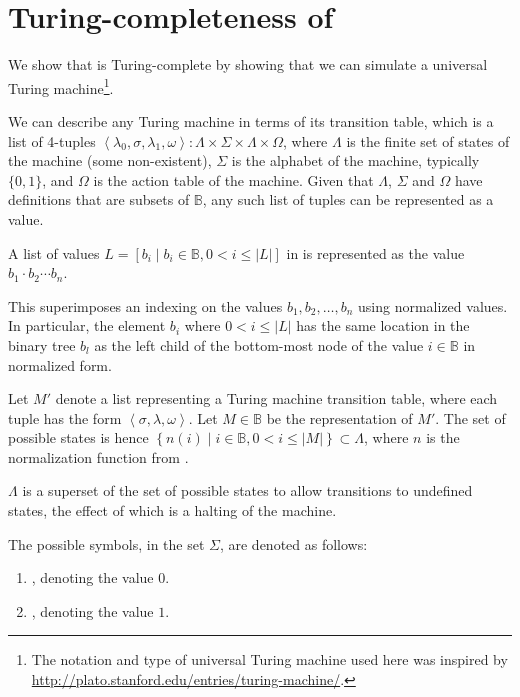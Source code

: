 \section{Turing-completeness of \D{}}

We show that \D{} is Turing-complete by showing that we can simulate a
universal Turing machine\footnote{The notation and type of universal Turing
machine used here was inspired by
\url{http://plato.stanford.edu/entries/turing-machine/}.}.

We can describe any Turing machine in terms of its transition table, which is a
list of 4-tuples $\left\langle \lambda_0, \sigma, \lambda_1, \omega
\right\rangle : \Lambda \times \Sigma \times \Lambda \times \Omega$, where
$\Lambda$ is the finite set of states of the machine (some non-existent),
$\Sigma$ is the alphabet of the machine, typically $\{0,1\}$, and $\Omega$ is
the action table of the machine. Given that $\Lambda$, $\Sigma$ and $\Omega$
have definitions that are subsets of $\mathbb{B}$, any such list of tuples can
be represented as a \D{} value. 

\begin{definition} A list of values $L=\left[ b_i \mid b_i\in\mathbb{B}, 0 < i
\leq |L| \right]$ in \D{} is represented as the value $b_1\cdot b_2\cdots
b_n$.\end{definition}

This superimposes an indexing on the values $b_1,b_2,\ldots,b_n$ using
normalized \D{} values. In particular, the element $b_i$ where $0<i\leq|L|$ has
the same location in the binary tree $b_l$ as the left child of the bottom-most
node of the value $i\in\mathbb{B}$ in normalized form.

\begin{definition} Let $M'$ denote a list representing a Turing machine
transition table, where each tuple has the form $\left\langle \sigma, \lambda,
\omega \right\rangle$. Let $M\in\mathbb{B}$ be the \D{} representation of $M'$.
The set of possible states is hence $\left\{ n(i)\mid i\in\mathbb{B},
0<i\leq|M| \right\}\subset\Lambda$, where $n$ is the normalization
function from .\end{definition}

$\Lambda$ is a superset of the set of possible states to allow transitions to
undefined states, the effect of which is a halting of the machine.

\begin{definition}\label{definition:turing-alphabet} The possible symbols, in
the set $\Sigma$, are denoted as follows:

\begin{enumerate}

\item {}, denoting the value $0$.

\item {}, denoting the value $1$.

\end{enumerate}

\end{definition}

